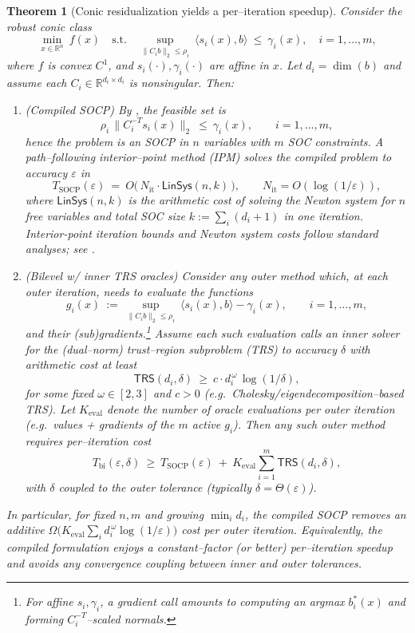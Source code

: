 \documentclass[11pt]{article}
\numberwithin{equation}{section}
\theoremstyle{upright}
\newtheorem{theorem}{Theorem}
\newcommand{\R}{\mathbb{R}}
\begin{document}
\begin{theorem}[Conic residualization yields a per–iteration speedup]\label{thm:conic-speedup}
Consider the robust conic class
\[
\min_{x\in\R^{n}}\ f(x)\quad\text{s.t.}\quad 
\sup_{\|C_i b\|_2\le \rho_i}\ \langle s_i(x),b\rangle \ \le\ \gamma_i(x),
\quad i=1,\dots,m,
\]
where $f$ is convex $C^1$, and $s_i(\cdot),\gamma_i(\cdot)$ are affine in $x$.
Let $d_i=\dim(b)$ and assume each $C_i\in\R^{d_i\times d_i}$ is nonsingular.
Then:

\begin{enumerate}[label=(\alph*), itemsep=0.4ex]
\item (\emph{Compiled SOCP}) By , the feasible set is
\[
\rho_i\,\|C_i^{-T}s_i(x)\|_2 \ \le\ \gamma_i(x),\qquad i=1,\dots,m,
\]
hence the problem is an SOCP in $n$ variables with $m$ SOC constraints.
A path–following interior–point method (IPM) solves the compiled problem to
accuracy $\varepsilon$ in
\[
T_{\mathrm{SOCP}}(\varepsilon)\ =\ O\big(\,N_{\mathrm{it}}\cdot \mathsf{LinSys}(n,k)\,\big),
\qquad N_{\mathrm{it}}=O(\log(1/\varepsilon)),
\]
where $\mathsf{LinSys}(n,k)$ is the arithmetic cost of solving the Newton system
for $n$ free variables and total SOC size $k:=\sum_i(d_i+1)$ in one iteration. Interior-point 
iteration bounds and Newton system costs follow standard analyses;
see \citealp{NesterovNemirovskii1994,Renegar2001,BoydVandenberghe2004}.

\item (\emph{Bilevel w/ inner TRS oracles}) Consider any outer method which, at each
outer iteration, needs to evaluate the functions
\[
g_i(x)\ :=\ \sup_{\|C_i b\|_2\le\rho_i}\ \langle s_i(x),b\rangle - \gamma_i(x),
\qquad i=1,\dots,m,
\]
and their (sub)gradients.\footnote{For affine $s_i,\gamma_i$, a gradient call
amounts to computing an argmax $b_i^*(x)$ and forming $C_i^{-T}$–scaled normals.}
Assume each such evaluation calls an inner solver for the (dual–norm) trust–region
subproblem (TRS) to accuracy $\delta$ with arithmetic cost at least
\[
\mathsf{TRS}(d_i,\delta)\ \ge\ c\cdot d_i^{\,\omega}\,\log(1/\delta),
\]
for some fixed $\omega\in[2,3]$ and $c>0$ (e.g.\ Cholesky/eigendecomposition–based TRS).
Let $K_{\mathrm{eval}}$ denote the number of oracle evaluations per outer iteration
(e.g.\ values + gradients of the $m$ active $g_i$).
Then any such outer method requires per–iteration cost
\[
T_{\mathrm{bi}}(\varepsilon,\delta)\ \ge\ T_{\mathrm{SOCP}}(\varepsilon)\ +\
K_{\mathrm{eval}}\sum_{i=1}^m \mathsf{TRS}(d_i,\delta),
\]
with $\delta$ coupled to the outer tolerance (typically $\delta=\Theta(\varepsilon)$).
\end{enumerate}
In particular, for fixed $n,m$ and growing $\min_i d_i$, the compiled SOCP removes an
additive $\Omega\!\big(K_{\mathrm{eval}}\sum_i d_i^{\,\omega}\log(1/\varepsilon)\big)$
cost per outer iteration. Equivalently, the compiled formulation enjoys a constant–factor
(or better) per–iteration speedup and avoids any convergence coupling between inner and outer tolerances.
\end{theorem}
\end{document}
